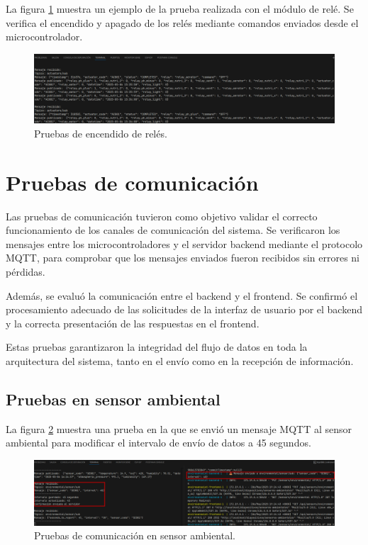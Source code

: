 La figura \ref{fig:prueba_rele_2} muestra un ejemplo de la prueba realizada con
el módulo de relé. Se verifica el encendido y apagado de los relés mediante
comandos enviados desde el microcontrolador.

\begin{figure}[H]
    \centering
    \includegraphics[width=\textwidth]{Images/54_actuadores_activacion.png}
    \caption[Pruebas de encendido de relés]{Pruebas de encendido de relés.}
    \label{fig:prueba_rele_2}
\end{figure}

\section{Pruebas de comunicación}

Las pruebas de comunicación tuvieron como objetivo validar el correcto
funcionamiento de los canales de comunicación del sistema. Se verificaron los
mensajes entre los microcontroladores y el servidor backend mediante el
protocolo MQTT, para comprobar que los mensajes enviados fueron recibidos sin
errores ni pérdidas.

Además, se evaluó la comunicación entre el backend y el frontend. Se confirmó
el procesamiento adecuado de las solicitudes de la interfaz de usuario por el
backend y la correcta presentación de las respuestas en el frontend.

Estas pruebas garantizaron la integridad del flujo de datos en toda la
arquitectura del sistema, tanto en el envío como en la recepción de
información.

\subsection{Pruebas en sensor ambiental}

La figura \ref{fig:prueba_mqtt_sensor_ambiental_1} muestra una prueba en la que
se envió un mensaje MQTT al sensor ambiental para modificar el intervalo de
envío de datos a 45 segundos.

\begin{figure}[H]
    \centering
    \includegraphics[width=\textwidth]{Images/55_prueba_mqtt_sensor_ambiental_1.png}
    \caption[Pruebas de comunicación en sensor ambiental]{Pruebas de comunicación en sensor ambiental.}
    \label{fig:prueba_mqtt_sensor_ambiental_1}
\end{figure}

